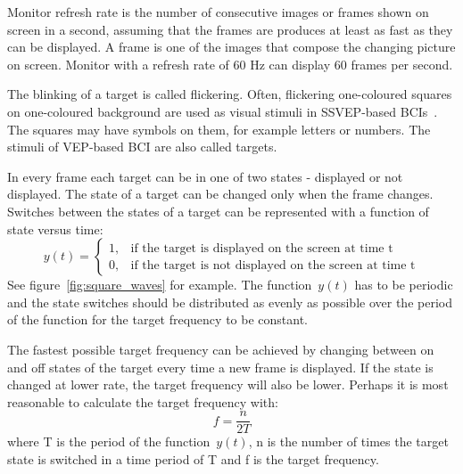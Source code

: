 Monitor refresh rate is the number of consecutive images or frames shown on screen in a second, assuming that the frames are produces at least as fast as they can be displayed. A frame is one of the images that compose the changing picture on screen. Monitor with a refresh rate of 60 Hz can display 60 frames per second. 

The blinking of a target is called flickering. Often, flickering one-coloured squares on one-coloured background are used as visual stimuli in \gls{SSVEP}-based \glspl{BCI}~\cite{ssvep_stim}. The squares may have symbols on them, for example letters or numbers. The stimuli of \gls{VEP}-based \gls{BCI} are also called targets.

In every frame each target can be in one of two states - displayed or not displayed. The state of a target can be changed only when the frame changes. Switches between the states of a target can be represented with a function of state versus time:
\begin{equation}
	\label{eq:state_vs_time}
	y(t)=
	\begin{cases}
		1,	&\mbox{if the target is displayed on the screen at time t}\\
		0,	&\mbox{if the target is not displayed on the screen at time t}
	\end{cases}
\end{equation}
See figure~\ref{fig:square_waves} for example. The function~$y(t)$ has to be periodic and the state switches should be distributed as evenly as possible over the period of the function for the target frequency to be constant.

The fastest possible target frequency can be achieved by changing between on and off states of the target every time a new frame is displayed. If the state is changed at lower rate, the target frequency will also be lower. Perhaps it is most reasonable to calculate the target frequency with:
\begin{equation}
	f = \frac{n}{2T}
\end{equation}
where T is the period of the function~$y(t)$, n is the number of times the target state is switched in a time period of T and f is the target frequency.

